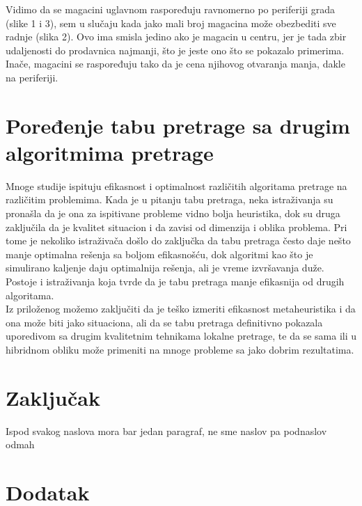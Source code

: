 \documentclass[a4paper]{article}
\begin{document}
Vidimo da se magacini uglavnom raspoređuju ravnomerno po periferiji grada (slike 1 i 3), sem u slučaju kada jako mali broj magacina može obezbediti sve radnje (slika 2). Ovo ima smisla jedino ako je magacin u centru, jer je tada zbir udaljenosti do prodavnica najmanji, što je jeste ono što se pokazalo primerima. Inače, magacini se raspoređuju tako da je cena njihovog otvaranja manja, dakle na periferiji.

\section{Poređenje tabu pretrage sa drugim algoritmima pretrage}
Mnoge studije ispituju efikasnost i optimalnost različitih algoritama pretrage na različitim problemima. Kada je u pitanju tabu pretraga, neka istraživanja su pronašla da je ona za ispitivane probleme vidno bolja heuristika, \cite{comptabubetter} dok su druga zaključila da je kvalitet situacion i da zavisi od dimenzija i oblika problema. \cite{comptabusimilar}\cite{comptabugoodperformance} Pri tome je nekoliko istraživača došlo do zaključka da tabu pretraga često daje nešto manje optimalna rešenja sa boljom efikasnošću, dok algoritmi kao što je simulirano kaljenje daju optimalnija rešenja, ali je vreme izvršavanja duže. \cite{comptabubettertimeworseresult} Postoje i istraživanja koja tvrde da je tabu pretraga manje efikasnija od drugih algoritama. \cite{comptabuworse}\\

Iz priloženog možemo zaključiti da je teško izmeriti efikasnost metaheuristika i da ona može biti jako situaciona, ali da se tabu pretraga definitivno pokazala uporedivom sa drugim kvalitetnim tehnikama lokalne pretrage, te da se sama ili u hibridnom obliku može primeniti na mnoge probleme sa jako dobrim rezultatima.

\section{Zaključak}
Ispod svakog naslova mora bar jedan paragraf, ne sme naslov pa podnaslov odmah


\appendix
{}



\appendix
\section{Dodatak}
\end{document}
